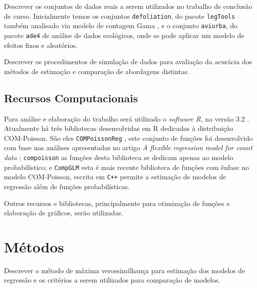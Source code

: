 \documentclass[
	12pt,				%
	openright,			%
	oneside,			%
	a4paper,			%
	english,			%
	brazil,				%
	]{abntex2}
\begin{document}
Descrever os conjuntos de dados reais a serem utilizados no 
trabalho de conclusão de curso. Inicialmente temos os 
conjuntos \texttt{defoliation}, do pacote \texttt{legTools}
também analisado via modelo de contagem Gama 
\cite{Zeviani2014}, e o conjunto \texttt{aviurba}, do pacote
\texttt{ade4} de análise de dados ecológicos, onde se pode 
aplicar um modelo de efeitos fixos e aleatórios.

Descrever os procedimentos de simulação de dados para 
avaliação da acurácia dos métodos de estimação e comparação 
de abordagens distintas.

\subsection{Recursos Computacionais}

Para análise e elaboração do trabalho será utilizado o
\textit{software R}, na versão 3.2 \cite{Rcore2015}. 
Atualmente há três bibliotecas desenvolvidas em R dedicadas
à distribuição COM-Poisson. São eles \texttt{COMPoissonReg}
\cite{COMPoissonReg}, este conjunto de funções foi 
desenvolvido com base nas análises apresentadas no artigo
\textit{A flexible regression model for count data} 
\cite{Sellers2010}; \texttt{compoisson} as funções desta 
biblioteca se dedicam apenas ao modelo probabilístico; e
\texttt{CompGLM} esta é mais recente biblioteca de funções 
com ênfase no modelo COM-Poisson, escrita em \texttt{C++}
permite a estimação de modelos de regressão além de funções 
probabilísticas.

Outros recursos e bibliotecas, principalmente para 
otimização de funções e elaboração de gráficos, serão 
utilizadas.

\section{Métodos}

Descrever o método de máxima verossimilhança para estimação 
dos modelos de regressão e os critérios a serem utilizados 
para comparação de modelos.
\end{document}
